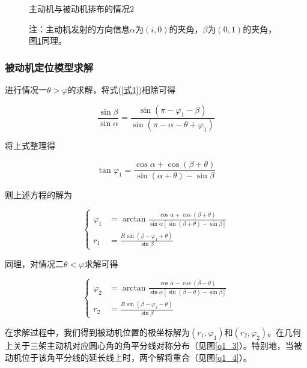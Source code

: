 \documentclass[withoutpreface,bwprint]{cumcmthesis} %
\begin{document}
\begin{figure}[H]
\begin{minipage}{0.49\textwidth}
        \caption{主动机与被动机排布的情况2}
        \label{q1_2}   
    \end{minipage}
    \caption*{\small 注：主动机发射的方向信息$\alpha$为$(i,0)$的夹角，$\beta$为$(0,1)$的夹角，图\ref{q1_2}同理。}
\end{figure}



\subsubsection{被动机定位模型求解}

进行情况一$\theta>\varphi$的求解，将式(\ref{式1})相除可得

\begin{equation}
    \frac{\sin\beta}{\sin\alpha} = \frac{\sin(\pi - \varphi_1 -\beta)}{\sin(\pi - \alpha - \theta + \varphi_1)}
\end{equation}

将上式整理得

\begin{equation}
    \tan\varphi_1= \frac{\cos\alpha + \cos(\beta +\theta)}{\sin(\alpha+\theta)- \sin\beta}
\end{equation}

则上述方程的解为

\begin{equation}
    \left\{
        \begin{aligned}
            \varphi_1 &= \arctan \frac{\cos\alpha+\cos(\beta+\theta)}{\sin\alpha[\sin(\beta+\theta)-\sin\beta]} \\
            r_1 &= \frac{R \sin(\beta-\varphi_1+\theta)}{\sin\beta}
        \end{aligned}
    \right.
    \label{解1}
\end{equation}

同理，对情况二$\theta<\varphi$求解可得

\begin{equation}
    \left\{
        \begin{aligned}
            \varphi_2 &= \arctan \frac{\cos\alpha-\cos(\beta-\theta)}{\sin\alpha[\sin(\beta-\theta)-\sin\beta]} \\
            r_2 &= \frac{R \sin(\beta-\varphi_2-\theta)}{\sin\beta}
        \end{aligned}
    \right.
\end{equation}

在求解过程中，我们得到被动机位置的极坐标解为\((r_1,\varphi_1)\)和\((r_2,\varphi_2)\)。在几何上关于三架主动机对应圆心角的角平分线对称分布（见图\ref{q1_3}）。特别地，当被动机位于该角平分线的延长线上时，两个解将重合（见图\ref{q1_4}）。
\end{document}
